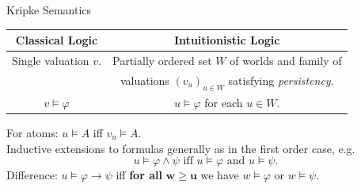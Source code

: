 \documentclass{cubeamer}
\begin{document}
	\begin{frame}{Kripke Semantics}
		\centering
		\vspace*{1cm}
		\begin{tabular}{c|c}
			Classical Logic&Intuitionistic Logic\\
			\hline
			Single valuation $v$.&Partially ordered set $W$ of worlds and family of\\&valuations $(v_u)_{u\in W}$ satisfying \emph{persistency}.\\
			\hline
			$v\models\varphi$&$u\models\varphi$ for each $u\in W$.	
		\end{tabular}
		\vspace*{.5cm}

		For atoms: $u\models A$ iff $v_u\models A$.\\
		Inductive extensions to formulas generally as in the first order case, e.g. \[u\models \varphi\wedge\psi \text{ iff } u\models\varphi \text{ and } u\models\psi.\]\vspace*{1.5cm}
		Difference: $u\models\varphi\to\psi$ iff \textbf{for all} $\mathbf{w}\geq \mathbf{u}$ we have $w\models\varphi$ or $w\models\psi$.
	\end{frame}
	
\end{document}
